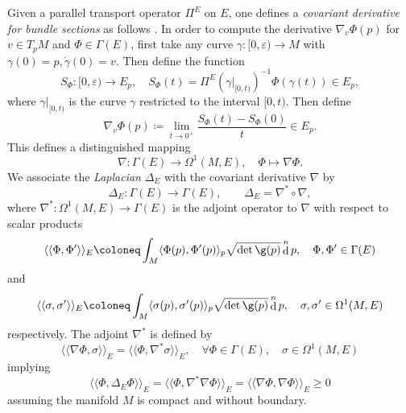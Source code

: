 \documentclass[10pt,reqno]{amsart}
\numberwithin{equation}{section}
\theoremstyle{bfnote}
\theoremstyle{bfdef}
\newcommand{\la}{\langle}
\newcommand{\ra}{\rangle}
\newcommand{\lla}{\langle\langle}
\newcommand{\rra}{\rangle\rangle}
\newcommand{\veps}{\varepsilon}
\DeclareMathOperator{\dd}{d}
\begin{document}
Given a parallel transport operator $\Pi^{E}$ on $E$, one defines a \textit{covariant derivative for bundle sections} as follows \cite{hamiltonMathematicalGaugeTheory2017}. In order to compute the derivative $\nabla_{v}\Phi(p)$ for $v \in T_{p}M$ and $\Phi \in \Gamma(E)$, first take any curve $\gamma : [0,\veps) \to M$ with $\gamma(0) = p, \dot{\gamma}(0) = v$. Then define the function
	\begin{equation}
		S_{\Phi} : [0,\veps) \to E_{p}, \quad S_{\Phi}(t) = \Pi^{E}(\gamma|_{[0,t)})^{-1} \Phi(\gamma(t)) \in E_{p},
	\end{equation}
	where $\gamma|_{[0,t)}$ is the curve $\gamma$ restricted to the interval $[0,t)$. Then define
	\begin{equation}\label{eq:cov-der}
		\nabla_{v} \Phi(p) \coloneqq \lim_{t\to 0^{+}} \frac{S_{\Phi}(t) - S_{\Phi}(0)}{t} \in E_{p}.
	\end{equation}
	This defines a distinguished mapping
	\begin{equation}
		\nabla : \Gamma(E) \to \Omega^{1}(M,E), \quad \Phi \mapsto \nabla \Phi.
	\end{equation}
	We associate the \textit{Laplacian} $\Delta_{E}$ with the covariant derivative $\nabla$ by 
\begin{equation}
	\Delta_{E} : \Gamma(E) \to \Gamma(E),\qquad
	\Delta_{E} = \nabla^{*} \circ \nabla, 
\end{equation}
where $\nabla^{*} : \Omega^{1}(M,E) \to \Gamma(E)$ is the adjoint operator to $\nabla$ with respect to scalar products
	\begin{equation}
		\lla \Phi , \Phi' \rra_{E} \coloneq \int_{M} \la \Phi(p),\Phi'(p)\ra_{p} \sqrt{\det \g(p)} \dd^{n}p, \quad \Phi,\Phi' \in \Gamma(E)
	\end{equation}
	and
	\begin{equation}
		\lla \sigma,\sigma' \rra_{E} \coloneq \int_{M} \la \sigma(p),\sigma'(p) \ra _{p} \sqrt{\det \g(p)} \dd^{n}p, \quad \sigma,\sigma' \in \Omega^{1}(M,E)
	\end{equation}
	respectively. The adjoint $\nabla^*$ is defined by
	\begin{equation}
		\lla \nabla \Phi , \sigma \rra_{E} = \lla \Phi , \nabla^{*} \sigma \rra_{E}, \quad \forall \Phi \in \Gamma(E) ,\quad  \sigma \in \Omega^{1}(M,E)
	\end{equation}
	implying
	\begin{equation}
		\lla \Phi,\Delta_{E} \Phi \rra_{E} = \lla \Phi, \nabla^{*} \nabla \Phi \rra_{E} = \lla \nabla \Phi , \nabla \Phi \rra_{E} \geq 0
	\end{equation}
	assuming the manifold $M$ is compact and without boundary.
\end{document}
